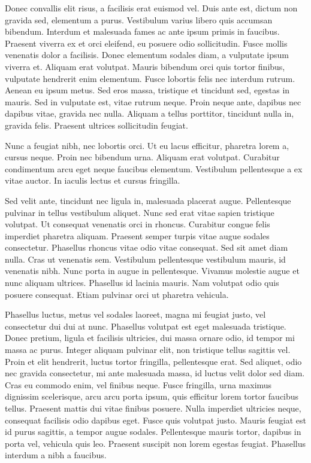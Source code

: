 \documentclass{homework}
\begin{document}
Donec convallis elit risus, a facilisis erat euismod vel. Duis ante est, dictum non gravida sed, elementum a purus. Vestibulum varius libero quis accumsan bibendum. Interdum et malesuada fames ac ante ipsum primis in faucibus. Praesent viverra ex et orci eleifend, eu posuere odio sollicitudin. Fusce mollis venenatis dolor a facilisis. Donec elementum sodales diam, a vulputate ipsum viverra et. Aliquam erat volutpat. Mauris bibendum orci quis tortor finibus, vulputate hendrerit enim elementum. Fusce lobortis felis nec interdum rutrum. Aenean eu ipsum metus. Sed eros massa, tristique et tincidunt sed, egestas in mauris. Sed in vulputate est, vitae rutrum neque. Proin neque ante, dapibus nec dapibus vitae, gravida nec nulla. Aliquam a tellus porttitor, tincidunt nulla in, gravida felis. Praesent ultrices sollicitudin feugiat.

Nunc a feugiat nibh, nec lobortis orci. Ut eu lacus efficitur, pharetra lorem a, cursus neque. Proin nec bibendum urna. Aliquam erat volutpat. Curabitur condimentum arcu eget neque faucibus elementum. Vestibulum pellentesque a ex vitae auctor. In iaculis lectus et cursus fringilla.

Sed velit ante, tincidunt nec ligula in, malesuada placerat augue. Pellentesque pulvinar in tellus vestibulum aliquet. Nunc sed erat vitae sapien tristique volutpat. Ut consequat venenatis orci in rhoncus. Curabitur congue felis imperdiet pharetra aliquam. Praesent semper turpis vitae augue sodales consectetur. Phasellus rhoncus vitae odio vitae consequat. Sed sit amet diam nulla. Cras ut venenatis sem. Vestibulum pellentesque vestibulum mauris, id venenatis nibh. Nunc porta in augue in pellentesque. Vivamus molestie augue et nunc aliquam ultrices. Phasellus id lacinia mauris. Nam volutpat odio quis posuere consequat. Etiam pulvinar orci ut pharetra vehicula.

Phasellus luctus, metus vel sodales laoreet, magna mi feugiat justo, vel consectetur dui dui at nunc. Phasellus volutpat est eget malesuada tristique. Donec pretium, ligula et facilisis ultricies, dui massa ornare odio, id tempor mi massa ac purus. Integer aliquam pulvinar elit, non tristique tellus sagittis vel. Proin et elit hendrerit, luctus tortor fringilla, pellentesque erat. Sed aliquet, odio nec gravida consectetur, mi ante malesuada massa, id luctus velit dolor sed diam. Cras eu commodo enim, vel finibus neque. Fusce fringilla, urna maximus dignissim scelerisque, arcu arcu porta ipsum, quis efficitur lorem tortor faucibus tellus. Praesent mattis dui vitae finibus posuere. Nulla imperdiet ultricies neque, consequat facilisis odio dapibus eget. Fusce quis volutpat justo. Mauris feugiat est id purus sagittis, a tempor augue sodales. Pellentesque mauris tortor, dapibus in porta vel, vehicula quis leo. Praesent suscipit non lorem egestas feugiat. Phasellus interdum a nibh a faucibus.
\end{document}
